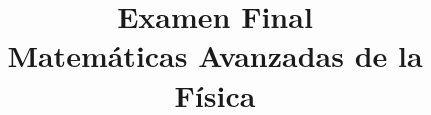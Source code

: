 
\author{}
\title{Examen Final  \\ \large{Matemáticas Avanzadas de la Física}\vspace{-50pt}}
\date{ }

\renewcommand\labelenumii{\theenumi.{\arabic{enumii})}}
\maketitle
\fontsize{14}{14}\selectfont
\begin{enumerate}

\end{enumerate}
